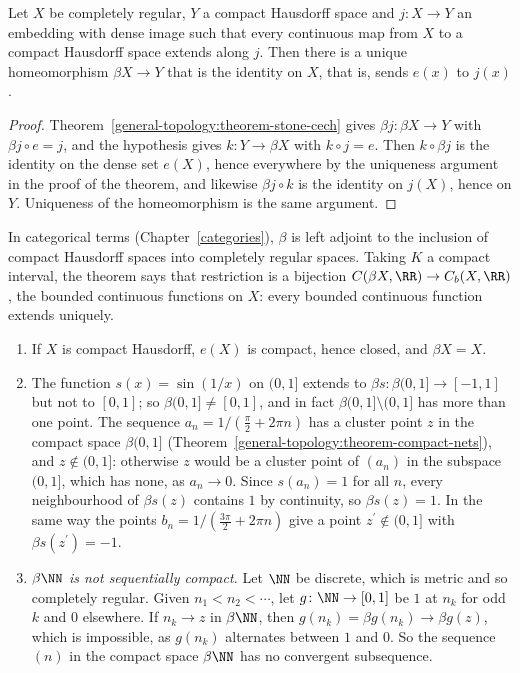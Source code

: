 \begin{corollary}\label{general-topology:corollary-stone-cech-unique}
Let $X$ be completely regular, $Y$ a compact Hausdorff space and $j \colon X \to Y$ an embedding with dense image such that every continuous map from $X$ to a compact Hausdorff space extends along $j$. Then there
is a unique homeomorphism $\beta X \to Y$ that is the identity on $X$, that is, sends $e(x)$ to $j(x)$.
\end{corollary}

\begin{proof}
Theorem~\ref{general-topology:theorem-stone-cech} gives $\beta j \colon \beta X \to Y$ with $\beta j \circ e = j$, and the hypothesis gives $k \colon Y \to \beta X$ with $k \circ j = e$. Then $k \circ \beta j$
is the identity on the dense set $e(X)$, hence everywhere by the uniqueness argument in the proof of the theorem, and likewise $\beta j \circ k$ is the identity on $j(X)$, hence on $Y$. Uniqueness of the
homeomorphism is the same argument.
\end{proof}

In categorical terms (Chapter~\ref{categories}), $\beta$ is left adjoint to the inclusion of compact Hausdorff spaces into completely regular spaces. Taking $K$ a compact interval, the theorem says that
restriction is a bijection $C(\beta X, \RR) \to C_b(X, \RR)$, the bounded continuous functions on $X$: every bounded continuous function extends uniquely.

\begin{example}\label{general-topology:example-stone-cech}
\begin{enumerate}
\item If $X$ is compact Hausdorff, $e(X)$ is compact, hence closed, and $\beta X = X$.
\item The function $s(x) = \sin(1/x)$ on $(0, 1]$ extends to $\beta s \colon \beta(0, 1] \to [-1, 1]$ but not to $[0, 1]$; so $\beta(0, 1] \neq [0, 1]$, and in fact $\beta(0, 1] \setminus (0, 1]$ has more than one
point. The sequence $a_n = 1/(\frac\pi2 + 2\pi n)$ has a cluster point $z$ in the compact space $\beta(0, 1]$ (Theorem~\ref{general-topology:theorem-compact-nets}), and $z \notin (0, 1]$: otherwise $z$ would be a cluster
point of $(a_n)$ in the subspace $(0, 1]$, which has none, as $a_n \to 0$. Since $s(a_n) = 1$ for all $n$, every neighbourhood of $\beta s(z)$ contains $1$ by continuity, so $\beta s(z) = 1$. In the same way
the points $b_n = 1/(\frac{3\pi}2 + 2\pi n)$ give a point $z^{\prime} \notin (0, 1]$ with $\beta s(z^{\prime}) = -1$.
\item \emph{$\beta\NN$ is not sequentially compact.} Let $\NN$ be discrete, which is metric and so completely regular. Given $n_1 < n_2 < \cdots$, let $g \colon \NN \to [0, 1]$ be $1$ at $n_k$ for odd $k$
and $0$ elsewhere. If $n_k \to z$ in $\beta\NN$, then $g(n_k) = \beta g(n_k) \to \beta g(z)$, which is impossible, as $g(n_k)$ alternates between $1$ and $0$. So the sequence $(n)$ in the compact
space $\beta\NN$ has no convergent subsequence.
\end{enumerate}
\end{example}

